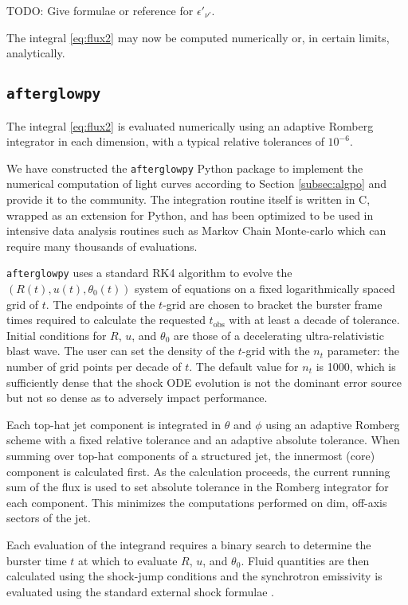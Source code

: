 \documentclass[twocolumn]{aastex62}
\newcommand{\afterglowpy}{{\tt afterglowpy}}
\newcommand{\tobs}{\ensuremath{t_{\mathrm{obs}}}}
\begin{document}
TODO: Give formulae or reference for $\epsilon'_{\nu'}$.

The integral \eqref{eq:flux2} may now be computed numerically or, in certain limits, analytically.

\subsection{\afterglowpy{}} \label{subsec:afterglowpy}


The integral \eqref{eq:flux2} is evaluated numerically using an adaptive Romberg integrator in each dimension, with a typical relative tolerances of $10^{-6}$.  

We have constructed the \afterglowpy{} Python package to implement the numerical computation of light curves according to Section \ref{subsec:algpo} and provide it to the community.  The integration routine itself is written in C, wrapped as an extension for Python, and has been optimized to be used in intensive data analysis routines such as Markov Chain Monte-carlo which can require many thousands of evaluations.  

\afterglowpy{} uses a standard RK4 algorithm to evolve the $(R(t), u(t), \theta_0(t))$ system of equations on a fixed logarithmically spaced grid of $t$.  The endpoints of the $t$-grid are chosen to bracket the burster frame times required to calculate the requested $\tobs$ with at least a decade of tolerance.  Initial conditions for $R$, $u$, and $\theta_0$ are those of a decelerating ultra-relativistic blast wave.  The user can set the density of the $t$-grid with the $n_t$ parameter: the number of grid points per decade of $t$.  The default value for $n_t$ is 1000, which is sufficiently dense that the shock ODE evolution is not the dominant error source but not so dense as to adversely impact performance.

Each top-hat jet component is integrated in $\theta$ and $\phi$ using an adaptive Romberg scheme with a fixed relative tolerance and an adaptive absolute tolerance.  When summing over top-hat components of a structured jet, the innermost (core) component is calculated first.  As the calculation proceeds, the current running sum of the flux is used to set absolute tolerance in the Romberg integrator for each component.  This minimizes the computations performed on dim, off-axis sectors of the jet.  

Each evaluation of the integrand requires a binary search to determine the burster time $t$ at which to evaluate $R$, $u$, and $\theta_0$.  Fluid quantities are then calculated using the shock-jump conditions and the synchrotron emissivity is evaluated using the standard external shock formulae \citep{Granot:2002aa,van-Eerten:2010aa}.  
\end{document}
